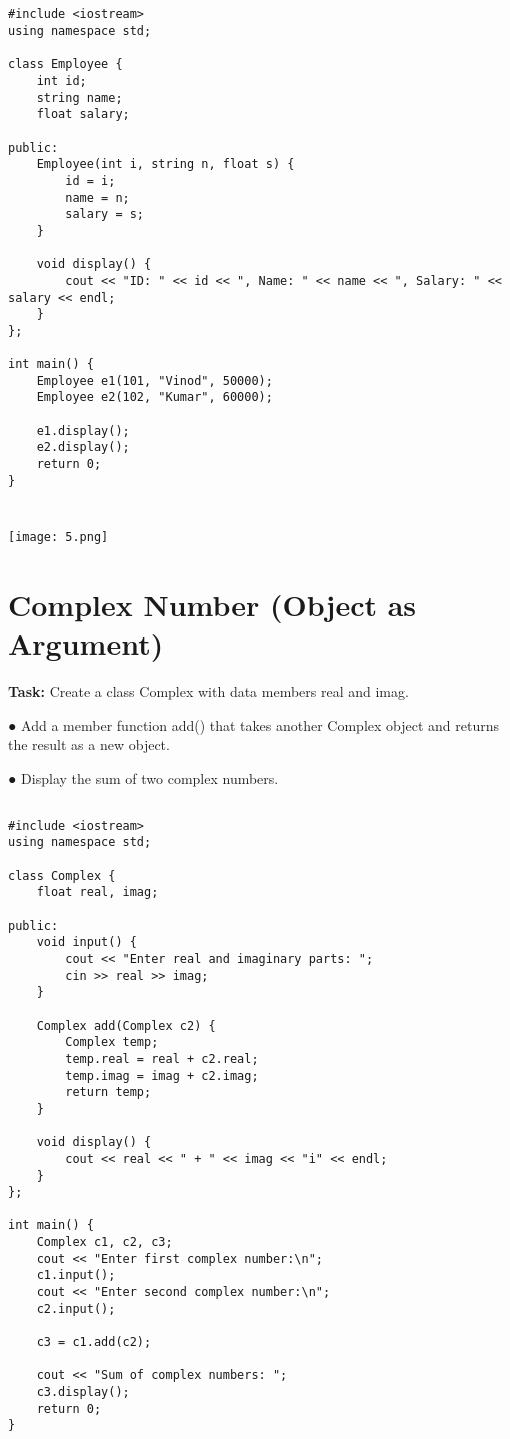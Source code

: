 \documentclass[12pt,a4paper]{article}
\begin{document}
\subsection{}
\begin{lstlisting}
#include <iostream>
using namespace std;

class Employee {
    int id;
    string name;
    float salary;

public:
    Employee(int i, string n, float s) {
        id = i;
        name = n;
        salary = s;
    }

    void display() {
        cout << "ID: " << id << ", Name: " << name << ", Salary: " << salary << endl;
    }
};

int main() {
    Employee e1(101, "Vinod", 50000);
    Employee e2(102, "Kumar", 60000);

    e1.display();
    e2.display();
    return 0;
}


\end{lstlisting}

\subsubsection{}
\begin{center}
    \texttt{[image: 5.png]}
\end{center}


\section{Complex Number (Object as Argument) }
\textbf{Task:} 
Create a class Complex with data members real and imag.
    \item ● Add a member function add() that takes another Complex object and returns the result as a new
object.
    \item ● Display the sum of two complex numbers.

\subsection{}
\begin{lstlisting}
#include <iostream>
using namespace std;

class Complex {
    float real, imag;

public:
    void input() {
        cout << "Enter real and imaginary parts: ";
        cin >> real >> imag;
    }

    Complex add(Complex c2) {
        Complex temp;
        temp.real = real + c2.real;
        temp.imag = imag + c2.imag;
        return temp;
    }

    void display() {
        cout << real << " + " << imag << "i" << endl;
    }
};

int main() {
    Complex c1, c2, c3;
    cout << "Enter first complex number:\n";
    c1.input();
    cout << "Enter second complex number:\n";
    c2.input();

    c3 = c1.add(c2);

    cout << "Sum of complex numbers: ";
    c3.display();
    return 0;
}


\end{lstlisting}
\end{document}
